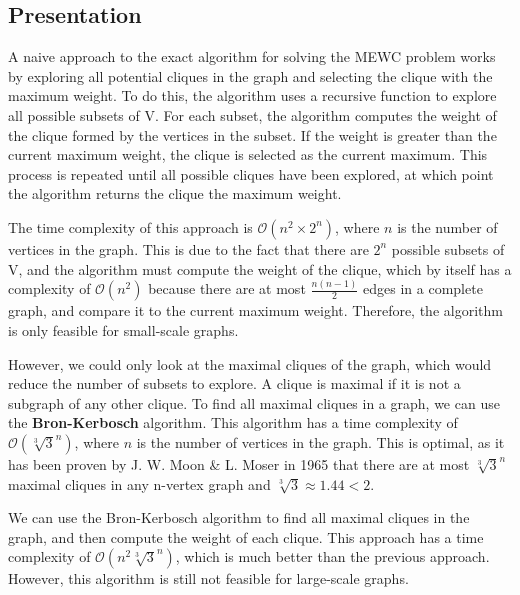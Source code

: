 \subsection{Presentation}

A naive approach to the exact algorithm for solving the MEWC problem works by
exploring all potential cliques in the graph and selecting the clique with the
maximum weight. To do this, the algorithm uses a recursive function to explore
all possible subsets of V. For each subset, the algorithm computes the weight of
the clique formed by the vertices in the subset. If the weight is greater than the
current maximum weight, the clique is selected as the current maximum. This
process is repeated until all possible cliques have been explored, at which point
the algorithm returns the clique the maximum weight.
\bigskip

The time complexity of this approach is $\mathcal{O}(n^2\times2^n)$, where $n$
is the number of vertices in the graph. This is due to the fact that there are
$2^n$ possible subsets of V, and the algorithm must compute the weight of the clique,
which by itself has a complexity of $\mathcal{O}(n^2)$ because there are at most
$\frac{n(n-1)}{2}$ edges in a complete graph, and compare it to the current
maximum weight. Therefore, the algorithm is only feasible for small-scale graphs.
\bigskip

However, we could only look at the maximal cliques of the graph, which would
reduce the number of subsets to explore. A clique is maximal if it is not a
subgraph of any other clique. To find all maximal cliques in a graph, we can use
the \textbf{Bron-Kerbosch} algorithm\cite{finding-all-cliques-of-an-undirected-graph}.
This algorithm has a time complexity of $\mathcal{O}(\sqrt[3]{3}^n)$, where $n$
is the number of vertices in the graph. This is optimal, as it has been proven by
J. W. Moon \& L. Moser in 1965\cite{on-cliques-in-graphs} that there are at most
$\sqrt[3]{3}^n$ maximal cliques in any n-vertex graph and $\sqrt[3]{3} \approx 1.44 < 2$.
\bigskip

We can use the Bron-Kerbosch algorithm to find all maximal cliques in the graph,
and then compute the weight of each clique. This approach has a time complexity of
$\mathcal{O}(n^2\sqrt[3]{3}^n)$, which is much better than the previous
approach. However, this algorithm is still not feasible for large-scale graphs.